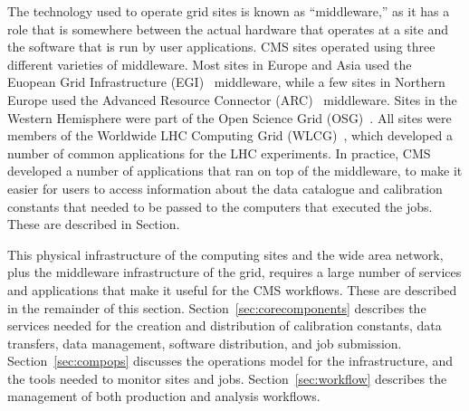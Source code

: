 The technology used to operate grid sites is known as ``middleware,'' as it
has a role that is somewhere between the actual hardware that operates at a
site and the software that is run by user applications.  CMS sites operated
using three different varieties of middleware.  Most sites in Europe and
Asia used the Euopean Grid Infrastructure (EGI)~\cite{EGI} middleware,
while a few sites in Northern Europe used the Advanced Resource Connector
(ARC)~\cite{ARC} middleware.  Sites in the Western Hemisphere were part of
the Open Science Grid (OSG)~\cite{OSG}.  All sites were members of the
Worldwide LHC Computing Grid (WLCG)~\cite{WLCG}, which developed a number
of common applications for the LHC experiments.  In practice, CMS developed
a number of applications that ran on top of the middleware, to make it
easier for users to access information about the data catalogue and
calibration constants that needed to be passed to the computers that
executed the jobs.  These are described in Section.

This physical infrastructure of the computing sites and the wide area
network, plus the middleware infrastructure of the grid, requires a large
number of services and applications that make it useful for the CMS
workflows.  These are described in the remainder of this section.
Section~\ref{sec:corecomponents} describes the services needed for the
creation and distribution of calibration constants, data transfers, data
management, software distribution, and job submission.
Section~\ref{sec:compops} discusses the operations model for the
infrastructure, and the tools needed to monitor sites and jobs.
Section~\ref{sec:workflow} describes the management of both production and
analysis workflows.

